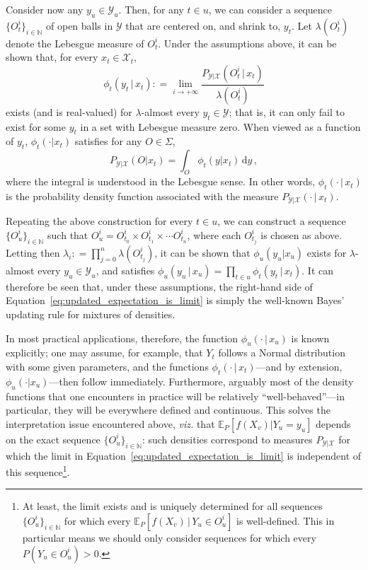 \documentclass[twoside,11pt]{article}
\newcommand{\nats}{\mathbb{N}}
\newcommand{\states}{\mathcal{X}}
\newcommand{\observs}{\mathcal{Y}}
\newcommand{\coloneqq}{:\!=}
\begin{document}
Consider now any $y_u\in\observs_u$. Then, for any $t\in u$, we can consider a sequence $\{O_t^i\}_{i\in\nats}$ of open balls in $\observs$ that are centered on, and shrink to, $y_t$. Let $\lambda(O_t^i)$ denote the Lebesgue measure of $O_t^i$. Under the assumptions above, it can be shown that, for every $x_t\in\states_t$,
\begin{equation*}
\phi_t(y_t\,\vert\,x_t) \coloneqq \lim_{i\to+\infty} \frac{P_{\observs\vert\states}(O_t^i\,\vert\,x_t)}{\lambda(O_t^i)}
\end{equation*}
exists (and is real-valued) for $\lambda$-almost every $y_t\in\observs$; that is, it can only fail to exist for some $y_t$ in a set with Lebesgue measure zero. When viewed as a function of $y_t$, $\phi_t(\cdot\vert x_t)$ satisfies for any $O\in\Sigma$,
\begin{equation}\label{eq:density_generates_measure}
P_{\observs\vert\states}(O\vert x_t) = \int_{O}\phi_t(y\vert x_t) \,\mathrm{d}y\,,
\end{equation}
where the integral is understood in the Lebesgue sense. In other words, $\phi_t(\cdot\,\vert\,x_t)$ is the probability density function associated with the measure $P_{\observs\vert\states}(\cdot\,\vert\, x_t)$.

Repeating the above construction for every $t\in u$, we can construct a sequence $\{O_u^i\}_{i\in\nats}$ such that $O_u^i=O_{t_0}^i\times O_{t_1}^i\times\cdots O_{t_n}^i$, where each $O_{t_j}^i$ is chosen as above. Letting then $\lambda_i\coloneqq \prod_{j=0}^n\lambda(O_{t_j}^i)$, it can be shown that $\phi_u(y_u\vert x_u)$ exists for $\lambda$-almost every $y_u\in\observs_u$, and satisfies $\phi_u(y_u\,\vert\,x_u) = \prod_{t\in u} \phi_t(y_t\,\vert\,x_t)$.
It can therefore be seen that, under these assumptions, the right-hand side of Equation~\eqref{eq:updated_expectation_is_limit} is simply the well-known Bayes' updating rule for mixtures of densities. 

In most practical applications, therefore, the function $\phi_u(\cdot\,\vert\,x_u)$ is known explicitly; one may assume, for example, that $Y_t$ follows a Normal distribution with some given parameters, and the functions $\phi_t(\cdot\,\vert\,x_t)$---and by extension, $\phi_u(\cdot\vert x_u)$---then follow immediately. Furthermore, arguably most of the density functions that one encounters in practice will be relatively ``well-behaved''---in particular, they will be everywhere defined and continuous. This solves the interpretation issue encountered above, \emph{viz.} that $\mathbb{E}_P[f(X_v)\vert Y_u=y_u]$ depends on the exact sequence $\{O_u^i\}_{i\in\nats}$: such densities correspond to measures $P_{\observs\vert\states}$ for which the limit in Equation~\eqref{eq:updated_expectation_is_limit} is independent of this sequence\footnote{\label{fnote:extra_condition}At least, the limit exists and is uniquely determined for all sequences $\{O_u^i\}_{i\in\nats}$ for which every $\mathbb{E}_P[f(X_v)\,\vert\,Y_u\in O_u^i]$ is well-defined. This in particular means we should only consider sequences for which every $P(Y_u\in O_u^i)>0$.}.
\end{document}
